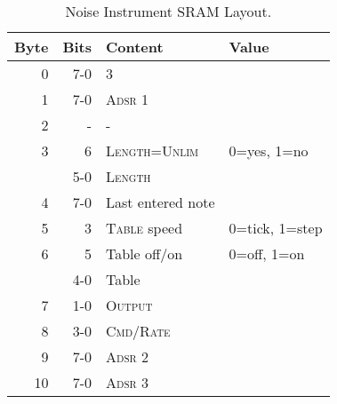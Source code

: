 \begin{table}
	\begin{center}
		\caption{Noise Instrument SRAM Layout.}
		\label{tab:sram-noise}
		\begin{tabular}{r|r|l|l}
			\toprule
   Byte	& Bits	& Content 		& Value \\
\midrule
      0	& 7-0 	& 3 			& \\
      1 & 7-0 	& \textsc{Adsr 1} 	& \\
      2 & -   	& -  		 	& \\
      3 & 6   	& \textsc{Length=Unlim}	& 0=yes, 1=no \\
        & 5-0 	& \textsc{Length} 	& \\
      4 & 7-0 	& Last entered note 	& \\
      5 & 3     & \textsc{Table} speed	& 0=tick, 1=step \\
      6	& 5   	& Table off/on		& 0=off, 1=on \\
	& 4-0 	& Table			& \\
      7 & 1-0 	& \textsc{Output}	& \\
      8 & 3-0 	& \textsc{Cmd/Rate}	& \\
      9 & 7-0 	& \textsc{Adsr 2}	& \\
     10 & 7-0 	& \textsc{Adsr 3}	& \\
     \bottomrule
		\end{tabular}
	\end{center}
\end{table}
